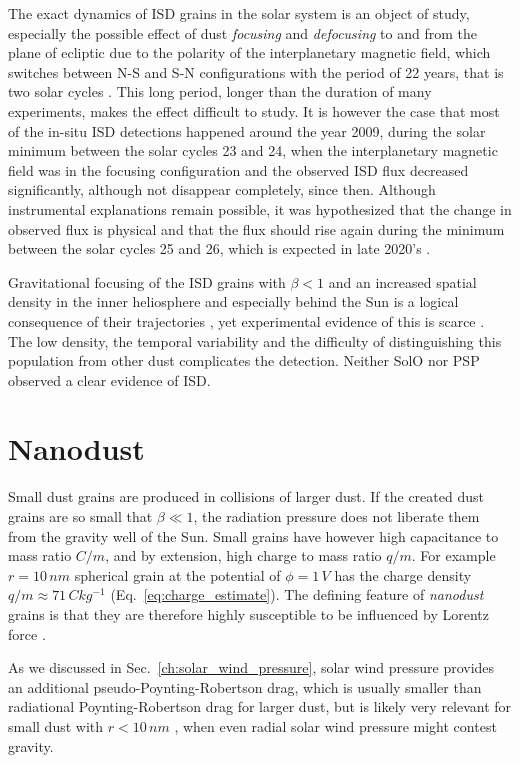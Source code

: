 The exact dynamics of ISD grains in the solar system is an object of study, especially the possible effect of dust \textit{focusing} and \textit{defocusing} to and from the plane of ecliptic due to the polarity of the interplanetary magnetic field, which switches between N-S and S-N configurations with the period of 22 years, that is two solar cycles \citep{morfill1979motion}. This long period, longer than the duration of many experiments, makes the effect difficult to study. It is however the case that most of the in-situ ISD detections happened around the year 2009, during the solar minimum between the solar cycles 23 and 24, when the interplanetary magnetic field was in the focusing configuration \citep{babic2022situ} and the observed ISD flux decreased significantly, although not disappear completely, since then. Although instrumental explanations remain possible, it was hypothesized that the change in observed flux is physical and that the flux should rise again during the minimum between the solar cycles 25 and 26, which is expected in late 2020's \citep{mann2010interstellar}. 

Gravitational focusing of the ISD grains with $\beta < 1$ and an increased spatial density in the inner heliosphere and especially behind the Sun is a logical consequence of their trajectories \citep{mann2010interstellar}, yet experimental evidence of this is scarce \citep{altobelli2006new}. The low density, the temporal variability and the difficulty of distinguishing this population from other dust complicates the detection. Neither SolO nor PSP observed a clear evidence of ISD.

\section{Nanodust}

Small dust grains are produced in collisions of larger dust. If the created dust grains are so small that $\beta \ll 1$, the radiation pressure does not liberate them from the gravity well of the Sun. Small grains have however high capacitance to mass ratio $C/m$, and by extension, high charge to mass ratio $q/m$. For example $r = 10 \, \si{nm}$ spherical grain at the potential of $\phi = 1 \, \si{V}$ has the charge density $q/m \approx 71 \, \si{Ckg^{-1}}$ (Eq.~\ref{eq:charge_estimate}). The defining feature of \textit{nanodust} grains is that they are therefore highly susceptible to be influenced by Lorentz force \citep{czechowski2010formation}. 

As we discussed in Sec.~\ref{ch:solar_wind_pressure}, solar wind pressure provides an additional pseudo-Poynting-Robertson drag, which is usually smaller than radiational Poynting-Robertson drag for larger dust, but is likely very relevant for small dust with $r<10\, \si{nm}$ \citep{mukai1982solar}, when even radial solar wind pressure might contest gravity. 

